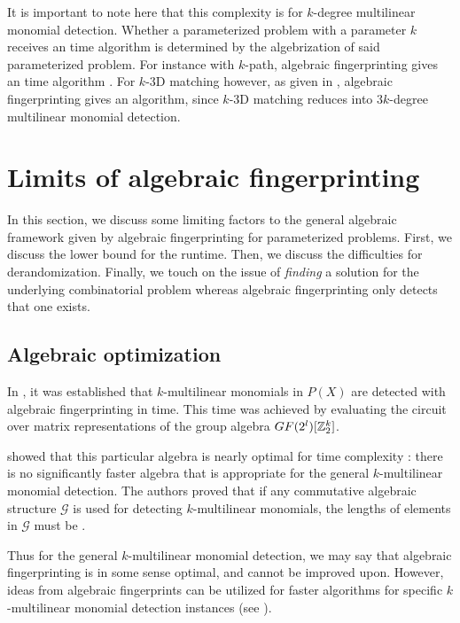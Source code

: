 It is important to note here that this complexity is for $k$-degree 
multilinear monomial detection. Whether a parameterized problem with a parameter 
$k$ receives an  time algorithm is determined by the algebrization 
of said parameterized problem. 
For instance with $k$-path, algebraic fingerprinting gives an  
time algorithm \cite{Williams09}. 
For $k$-3D matching however, as given in , 
algebraic fingerprinting gives an  algorithm, since 
$k$-3D matching reduces into $3k$-degree multilinear monomial detection.

\section{Limits of algebraic fingerprinting}
\label{sect:limits}

In this section, we discuss some limiting factors to the general 
algebraic framework given by 
algebraic fingerprinting for parameterized problems. First, 
we discuss the lower bound for the runtime. Then, we discuss 
the difficulties for derandomization. Finally, we touch on the issue of 
\emph{finding} a solution for the underlying combinatorial problem 
whereas algebraic fingerprinting only detects that one exists.

\subsection{Algebraic optimization}
\label{sect:algebra_is_optimal}

In , it was established that $k$-multilinear monomials 
in $P(X)$ are detected with 
algebraic fingerprinting in  time. 
This time was achieved by evaluating the circuit over matrix 
representations of the group algebra $GF(2^l)[\mathbb Z_2^k]$.

\citeauthor{KouWil09} showed that this particular algebra is nearly optimal 
for time complexity \cite{KouWil09}: there is no significantly faster algebra that 
is appropriate for the general $k$-multilinear monomial detection. 
The authors proved that if any commutative algebraic structure $\mathcal{G}$ is 
used for detecting $k$-multilinear monomials, 
the lengths of elements in $\mathcal{G}$ must be .

Thus for the general $k$-multilinear monomial detection, we may say 
that algebraic fingerprinting is in some sense 
optimal, and cannot be improved upon. 
However, 
ideas from algebraic fingerprints can be utilized for faster algorithms for 
specific $k$-multilinear monomial detection instances (see ).

